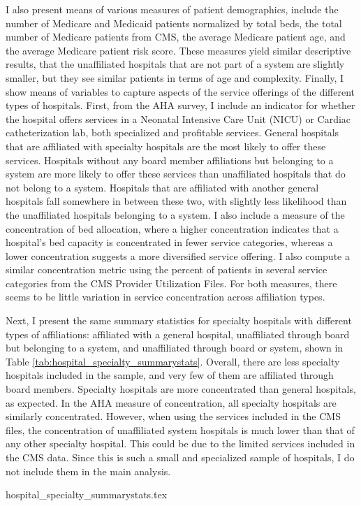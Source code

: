 \documentclass[12pt]{article}
\begin{document}
    I also present means of various measures of patient demographics, include the number of Medicare and Medicaid patients normalized by total beds, the total number of Medicare patients from CMS, the average Medicare patient age, and the average Medicare patient risk score. These measures yield similar descriptive results, that the unaffiliated hospitals that are not part of a system are slightly smaller, but they see similar patients in terms of age and complexity. Finally, I show means of variables to capture aspects of the service offerings of the different types of hospitals. First, from the AHA survey, I include an indicator for whether the hospital offers services in a Neonatal Intensive Care Unit (NICU) or Cardiac catheterization lab, both specialized and profitable services. General hospitals that are affiliated with specialty hospitals are the most likely to offer these services. Hospitals without any board member affiliations but belonging to a system are more likely to offer these services than unaffiliated hospitals that do not belong to a system. Hospitals that are affiliated with another general hospitals fall somewhere in between these two, with slightly less likelihood than the unaffiliated hospitals belonging to a system. I also include a measure of the concentration of bed allocation, where a higher concentration indicates that a hospital's bed capacity is concentrated in fewer service categories, whereas a lower concentration suggests a more diversified service offering. I also compute a similar concentration metric using the percent of patients in several service categories from the CMS Provider Utilization Files. For both measures, there seems to be little variation in service concentration across affiliation types.

    Next, I present the same summary statistics for specialty hospitals with different types of affiliations: affiliated with a general hospital, unaffiliated through board but belonging to a system, and unaffiliated through board or system, shown in Table \ref{tab:hospital_specialty_summarystats}. Overall, there are less specialty hospitals included in the sample, and very few of them are affiliated through board members. Specialty hospitals are more concentrated than general hospitals, as expected. In the AHA measure of concentration, all specialty hospitals are similarly concentrated. However, when using the services included in the CMS files, the concentration of unaffiliated system hospitals is much lower than that of any other specialty hospital. This could be due to the limited services included in the CMS data. Since this is such a small and specialized sample of hospitals, I do not include them in the main analysis. 

    {hospital_specialty_summarystats.tex}
    
    


  

    \newpage


    \printbibliography


    

    

    

    

    

	
	
	
\end{document}
